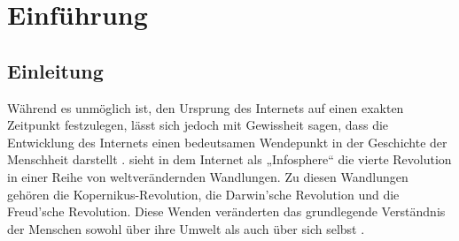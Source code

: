 \documentclass[a4paper]{scrartcl}
\begin{document}
\section{Einführung}

\subsection{Einleitung}
Während es unmöglich ist, den Ursprung des Internets auf einen exakten Zeitpunkt festzulegen, lässt sich jedoch mit Gewissheit sagen, dass die Entwicklung des Internets einen bedeutsamen Wendepunkt in der Geschichte der Menschheit darstellt \autocite[26]{Kleinrock}. \textcite{Floridi} sieht in dem Internet als „Infosphere“ \autocite[9]{Floridi} die vierte Revolution in einer Reihe von weltverändernden Wandlungen. Zu diesen Wandlungen gehören die Kopernikus-Revolution, die Darwin'sche Revolution und die Freud'sche Revolution. Diese Wenden veränderten das grundlegende Verständnis der Menschen sowohl über ihre Umwelt als auch über sich selbst \autocite[8f.]{Floridi}. \\
\end{document}
